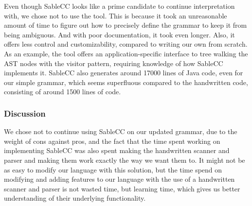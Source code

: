 Even though SableCC looks like a prime candidate to continue
interpretation with, we chose not to use the tool. This is because it
took an unreasonable amount of time to figure out how to precisely
define the grammar to keep it from being ambiguous. And with poor
documentation, it took even longer. Also, it offers less control and
customizability, compared to writing our own from scratch. As an
example, the tool offers an application-specific interface to tree
walking the AST nodes with the visitor pattern, requiring knowledge of
how SableCC implements it. SableCC also generates around 17000 lines of
Java code, even for our simple grammar, which seems superfluous compared
to the handwritten code, consisting of around 1500 lines of code.

\subsubsection{Discussion}
We chose not to continue using SableCC on our updated grammar, due
to the weight of cons against pros, and the fact that the time spent
working on implementing SableCC was also spent making the handwritten
scanner and parser and making them work exactly the way we want them to. It might
not be as easy to modify our language with this solution, but the time
spend on modifying and adding features to our language with the use of a
handwritten scanner and parser is not wasted time, but learning time, which
gives us better understanding of their underlying functionality.  

